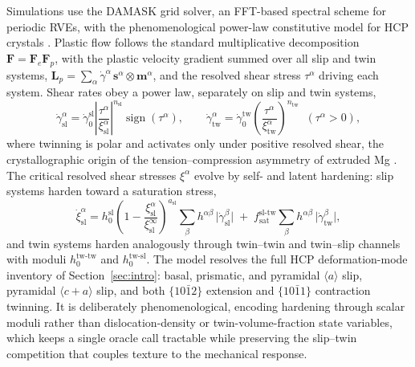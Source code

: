 \documentclass[preprint,12pt]{elsarticle}
\begin{document}
Simulations use the DAMASK grid solver, an FFT-based spectral scheme for periodic RVEs, with the phenomenological power-law constitutive model for HCP crystals \cite{Roters-DAMASK-2019}. Plastic flow follows the standard multiplicative decomposition $\mathbf{F} = \mathbf{F}_e \mathbf{F}_p$, with the plastic velocity gradient summed over all slip and twin systems, $\mathbf{L}_p = \sum_\alpha \dot\gamma^\alpha\, \mathbf{s}^\alpha \otimes \mathbf{m}^\alpha$, and the resolved shear stress $\tau^\alpha$ driving each system. Shear rates obey a power law, separately on slip and twin systems,
\begin{equation}
  \dot\gamma^\alpha_{\mathrm{sl}} = \dot\gamma_0^{\mathrm{sl}} \left| \frac{\tau^\alpha}{\xi^\alpha_{\mathrm{sl}}} \right|^{n_{\mathrm{sl}}} \operatorname{sign}(\tau^\alpha),
  \qquad
  \dot\gamma^\alpha_{\mathrm{tw}} = \dot\gamma_0^{\mathrm{tw}} \left( \frac{\tau^\alpha}{\xi^\alpha_{\mathrm{tw}}} \right)^{n_{\mathrm{tw}}} \;\; (\tau^\alpha > 0),
  \label{eq:flowrule}
\end{equation}
where twinning is polar and activates only under positive resolved shear, the crystallographic origin of the tension--compression asymmetry of extruded Mg \cite{Chapuis-Driver-2011,Agnew-Review-Mg-2006}. The critical resolved shear stresses $\xi^\alpha$ evolve by self- and latent hardening: slip systems harden toward a saturation stress,
\begin{equation}
  \dot\xi^\alpha_{\mathrm{sl}} = h_0^{\mathrm{sl}} \left( 1 - \frac{\xi^\alpha_{\mathrm{sl}}}{\xi^\infty_{\mathrm{sl}}} \right)^{a_{\mathrm{sl}}} \sum_\beta h^{\alpha\beta}\, \big|\dot\gamma^\beta_{\mathrm{sl}}\big|
  \;+\; f_{\mathrm{sat}}^{\mathrm{sl\text{-}tw}} \sum_\beta h^{\alpha\beta}\, \big|\dot\gamma^\beta_{\mathrm{tw}}\big|,
  \label{eq:hardening}
\end{equation}
and twin systems harden analogously through twin--twin and twin--slip channels with moduli $h_0^{\mathrm{tw\text{-}tw}}$ and $h_0^{\mathrm{tw\text{-}sl}}$. The model resolves the full HCP deformation-mode inventory of Section~\ref{sec:intro}: basal, prismatic, and pyramidal $\langle a\rangle$ slip, pyramidal $\langle c{+}a\rangle$ slip, and both $\{10\bar{1}2\}$ extension and $\{10\bar{1}1\}$ contraction twinning. It is deliberately phenomenological, encoding hardening through scalar moduli rather than dislocation-density or twin-volume-fraction state variables, which keeps a single oracle call tractable while preserving the slip--twin competition that couples texture to the mechanical response.
\end{document}
